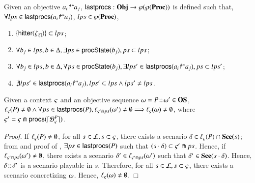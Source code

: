\begin{definition}[$\lastprocs$]
\label{def:lastprocs}
Given an objective ${a_i\!\Rsh^*\!\!a_j}$, $\mathsf{lastprocs}:
\mathbf{Obj}\to\wp(\wp(\mathbf{Proc}))$ is
defined such that, $\forall lps\in\mathsf{lastprocs}({a_i\!\Rsh^*\!\!a_j})$, 
$lps\in\wp(\mathbf{Proc})$,
\begin{enumerate}
\item $\{\mathsf{hitter}(\zeta_{|\zeta|})\} \subset lps$;
\item $\forall b_j\in lps, b\in\Delta, \exists ps\in\mathsf{procState}(b_j), ps\subset lps$;
\item $\forall b_j\in lps, b\in\Delta, 
		\forall ps\in\mathsf{procState}(b_j),
			\exists lps'\in\mathsf{lastprocs}({a_i\!\Rsh^*\!\!a_j}),
				ps\subset lps'$;
\item $\nexists lps'\in\mathsf{lastprocs}({a_i\!\Rsh^*\!\!a_j}), lps'\subset lps \wedge
									lps'\neq lps$.
\end{enumerate}
\end{definition}

\begin{theorem}
\label{thm:ordered-ua}
Given a context $\varsigma$ and an objective sequence $\omega =
P\!::\!\omega'\in\mathbf{OS}$,
$\ell_\varsigma(P)\neq\emptyset \wedge
	\forall ps \in\mathsf{lastprocs}(P),
	\ell_{\varsigma'\Cap ps}(\omega')\neq\emptyset
	\Longrightarrow \ell_\varsigma(\omega)\neq\emptyset$,
where $\varsigma' = \varsigma\Cap\mathsf{procs}(\lceil \mathcal{B}_{\varsigma}^{P}\rceil)$.
\end{theorem}
\begin{proof}
If $\ell_\varsigma(P)\neq\emptyset$,
for all $s\in \mathcal{L}, s\subset\varsigma$,
there exists a scenario $\delta\in\ell_\varsigma(P)\cap\mathbf{Sce}(s)$;
from  and proof of ,
$\exists ps\in\mathsf{lastprocs}(P)$ such that
$(s\cdot\delta)\subset\varsigma'\Cap ps$.
Hence, if $\ell_{\varsigma'\Cap ps}(\omega')\neq\emptyset$,
there exists a scenario $\delta'\in\ell_{\varsigma'\Cap ps}(\omega')$ such that
$\delta'\in\mathbf{Sce}(s\cdot\delta)$.
Hence, $\delta\!::\!\delta'$ is a scenario playable in $s$.
Therefore, for all $s\in \mathcal{L}, s\subset\varsigma$, there exists a scenario
concretizing $\omega$.
Hence, $\ell_\varsigma(\omega)\neq\emptyset$.
\end{proof}


